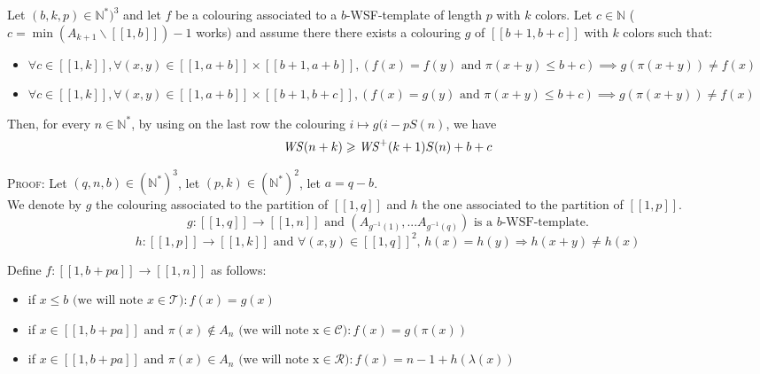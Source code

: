 \begin{proposition}
Let \((b, k, p) \in \mathbb{N}^*)^3\) and let \(f\) be a colouring associated to a \(b\)-WSF-template of length \(p\) with \(k\) colors. Let
\(c \in \mathbb{N}\) (\(c = \min (A_{k+1} \backslash [\![1, b ]\!]) - 1\) works) and assume there there exists a colouring \(g\) of
\([\![b + 1, b + c]\!]\) with \(k\) colors such that:

\begin{itemize}
	\item \(\forall c \in [\![1, k]\!], \forall (x, y) \in  [\![1, a + b]\!] \times  [\![b + 1, a + b]\!], (f(x) = f(y) \text{ and } \pi(x + y) \leqslant b + c)
	\implies g(\pi(x + y)) \neq f(x)\)
	\item \(\forall c \in [\![1, k]\!], \forall (x, y) \in  [\![1, a + b]\!] \times  [\![b + 1, b + c]\!],  (f(x) = g(y) \text{ and } \pi(x + y) \leqslant b + c)
\implies g(\pi(x + y)) \neq f(x)\)
\end{itemize}

Then, for every \(n \in \mathbb{N}^*\), by using on the last row the colouring \(i \longmapsto g(i - p S(n)\), we have\\
\[ \mathit{WS}(n+k) \geqslant \mathit{WS}^+(k+1) S(n) + b + c\]
\end{proposition}

\textsc{Proof:} Let \((q,n,b) \in (\mathbb{N}^*)^3\), let \( (p,k) \in (\mathbb{N}^*)^2\), let \(a=q-b\). \\
We denote by \(g\) the colouring associated to the partition of \([\![1,q]\!]\) and \(h\) the
one associated to the partition of \([\![1,p]\!]\).
\[ g : [\![1,q]\!] \longrightarrow [\![1,n]\!] \text{ and } (A_{g^{-1}(1)},...A_{g^{-1}(q)})\text{ is a \(b\)-WSF-template.}
\]
\[h : [\![1,p]\!] \longrightarrow [\![1,k]\!] \text{ and } \forall (x,y) \in [\![1,q]\!]^2 \text{, } h(x) = h(y)
\Longrightarrow h(x+y) \neq h(x)
\]

Define \( f : [\![1,b+pa]\!] \longrightarrow [\![1,n]\!] \) as follows:

\begin{itemize}
\item if  \(x\leqslant b \text{ (we will note }x \in \mathcal{T}): f(x)=g(x)\)
\item if \( x \in [\![1,b+pa]\!] \text{ and } \pi(x) \notin A_n \text{ (we will note x} \in \mathcal{C}): f(x)=g(\pi(x))\)
\item if \( x \in [\![1,b+pa]\!]  \text{ and }\pi(x) \in A_n \text{ (we will note x} \in \mathcal{R}): f(x)=n-1+h(\lambda(x))\)
\end{itemize}

